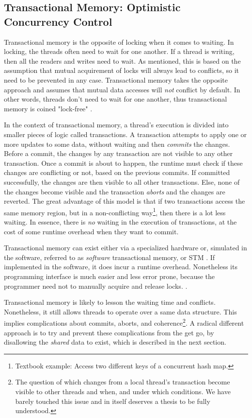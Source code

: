 \subsection{Transactional Memory: Optimistic Concurrency Control} \label{chap_bg:subsec:stm}

Transactional memory is the opposite of locking when it comes to waiting. In locking, the threads
often need to wait for one another. If a thread is writing, then all the readers and writes need to
wait. As mentioned, this is based on the assumption that mutual acquirement of locks will always
lead to conflicts, so it need to be prevented in any case. Transactional memory takes the opposite
approach and assumes that mutual data accesses will \textit{not} conflict by default. In other
words, threads don't need to wait for one another, thus transactional memory is coined "lock-free"
\cite{knightArchitectureMostlyFunctional1986}.


In the context of transactional memory, a thread's execution is divided into smaller pieces of logic
called transactions. A transaction attempts to apply one or more updates to some data, without
waiting and then \textit{commits} the changes. Before a commit, the changes by any transaction are
not visible to any other transaction. Once a commit is about to happen, the runtime must check if
these changes are conflicting or not, based on the previous commits. If committed successfully, the
changes are then visible to all other transactions. Else, none of the changes become visible and the
transaction \textit{aborts} and the changes are reverted. The great advantage of this model is that
if two transactions access the same memory region, but in a non-conflicting way\footnote{Textbook
example: Access two different keys of a concurrent hash map.}, then there is a lot less waiting. In
essence, there is \textit{no} waiting in the execution of transactions, at the cost of some runtime
overhead when they want to commit.

Transactional memory can exist either via a specialized hardware or, simulated in the software,
referred to as \textit{software} transactional memory, or STM
\cite{hammondTransactionalMemoryCoherence2004}. If implemented in the software, it does incur a
runtime overhead. Nonetheless its programming interface is much easier and less error prone, because
the programmer need not to manually acquire and release locks.
\cite{herlihyTransactionalMemoryArchitectural1993}.

Transactional memory is likely to lesson the waiting time and conflicts. Nonetheless, it still
allows threads to operate over a same data structure. This implies complications about commits,
aborts, and coherence\footnote{The question of which changes from a local thread's transaction
become visible to other threads and when, and under which conditions. We have barely touched this
issue and in itself deserves a thesis to be fully understood.}. A radical different approach is to
try and prevent these complications from the get go, by disallowing the \textit{shared} data to
exist, which is described in the next section.

